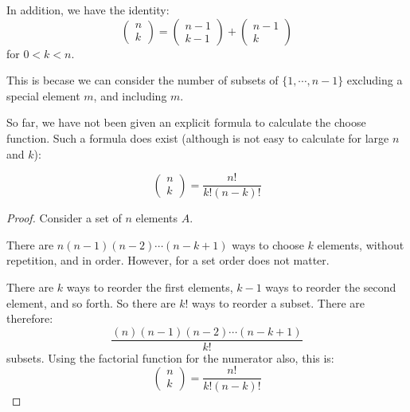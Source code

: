 \documentclass[../Main.tex]{subfiles}
\begin{document}
\begin{example}
    In addition, we have the identity:
    \begin{equation}
        \begin{pmatrix}n \\ k\end{pmatrix} = \begin{pmatrix}n - 1 \\ k - 1\end{pmatrix} + \begin{pmatrix}n - 1 \\ k\end{pmatrix}
        \label{eqnChooseAsSum}
    \end{equation}
    for $0 < k < n$.\par
    This is becase we can consider the number of subsets of $\{1, \cdots, n-1\}$ excluding a special element $m$, and including $m$.
\end{example}
So far, we have not been given an explicit formula to calculate the choose function. Such a formula does exist (although is not easy to calculate for large $n$ and $k$):
\begin{proposition}
    \begin{equation*}
        \begin{pmatrix}n \\ k\end{pmatrix} = \frac{n!}{k!(n-k)!}
    \end{equation*}
    \label{propChooseFunc}
\end{proposition}
\begin{proof}
    Consider a set of $n$ elements $A$.\par
    There are $n(n-1)(n-2) \cdots (n-k+1)$ ways to choose $k$ elements, without repetition, and in order. However, for a set order does not matter.\par
    There are $k$ ways to reorder the first elements, $k - 1$ ways to reorder the second element, and so forth. So there are $k!$ ways to reorder a subset. There are therefore:
    \begin{equation*}
        \frac{(n)(n-1)(n-2) \cdots (n-k+1)}{k!}
    \end{equation*}
    subsets. Using the factorial function for the numerator also, this is:
    \begin{equation*}
        \begin{pmatrix}n \\ k\end{pmatrix} = \frac{n!}{k!(n-k)!}
    \end{equation*}
\end{proof}
\end{document}
